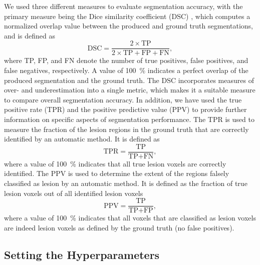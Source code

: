 We used three different measures to evaluate segmentation accuracy, with the
primary measure being the Dice similarity coefficient (DSC)
\cite{dice1945measures}, which computes a normalized overlap value between the
produced and ground truth segmentations, and is defined as
\begin{equation}
\text{DSC} = \frac{2 \times \text{TP}}{2 \times \text{TP} + \text{FP} +
\text{FN}},
\end{equation}
where TP, FP, and FN denote the number of true positives, false positives, and
false negatives, respectively. A value of \SI{100}{\percent} indicates a perfect
overlap of the produced segmentation and the ground truth.
The DSC incorporates measures of over- and underestimation into a single
metric, which makes it a suitable measure to compare overall segmentation
accuracy.
In addition, we have used the true positive rate (TPR) and the positive
predictive value (PPV) to provide further information on specific aspects of
segmentation performance. The TPR is used to measure the fraction of the lesion
regions in the ground truth that are correctly identified by
an automatic method. It is defined as
\begin{equation}
\text{TPR} = \frac{\text{TP}}{\text{TP} + \text{FN}},
\end{equation}
where a value of \SI{100}{\percent} indicates that all true lesion voxels are
correctly identified. The PPV is used to determine the extent of the regions
falsely classified as lesion by an automatic method. It is defined as the
fraction of true lesion voxels out of all identified lesion voxels
\begin{equation}
\text{PPV} = \frac{\text{TP}}{\text{TP} + \text{FP}},
\end{equation}
where a value of \SI{100}{\percent} indicates that all voxels that are
classified as lesion voxels are indeed lesion voxels as defined by the ground
truth (no false positives).

\subsection{Setting the Hyperparameters}


